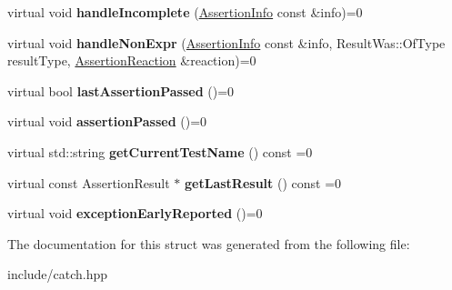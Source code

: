 \begin{DoxyCompactItemize}
\item 
virtual void {\bfseries handle\+Incomplete} (\hyperlink{structCatch_1_1AssertionInfo}{Assertion\+Info} const \&info)=0\hypertarget{structCatch_1_1IResultCapture_a89b89372eb09cc44f8dcad363de6157d}{}\label{structCatch_1_1IResultCapture_a89b89372eb09cc44f8dcad363de6157d}

\item 
virtual void {\bfseries handle\+Non\+Expr} (\hyperlink{structCatch_1_1AssertionInfo}{Assertion\+Info} const \&info, Result\+Was\+::\+Of\+Type result\+Type, \hyperlink{structCatch_1_1AssertionReaction}{Assertion\+Reaction} \&reaction)=0\hypertarget{structCatch_1_1IResultCapture_ab7dbdf8aa28427119583e24dbb302c63}{}\label{structCatch_1_1IResultCapture_ab7dbdf8aa28427119583e24dbb302c63}

\item 
virtual bool {\bfseries last\+Assertion\+Passed} ()=0\hypertarget{structCatch_1_1IResultCapture_a973435fbdcb2f6f07a0ec5719a01e956}{}\label{structCatch_1_1IResultCapture_a973435fbdcb2f6f07a0ec5719a01e956}

\item 
virtual void {\bfseries assertion\+Passed} ()=0\hypertarget{structCatch_1_1IResultCapture_a9b0ef2cb071e9a9dc6ec1b533026aea7}{}\label{structCatch_1_1IResultCapture_a9b0ef2cb071e9a9dc6ec1b533026aea7}

\item 
virtual std\+::string {\bfseries get\+Current\+Test\+Name} () const =0\hypertarget{structCatch_1_1IResultCapture_aea1617f4a84cc648246aa3ed6918b5bf}{}\label{structCatch_1_1IResultCapture_aea1617f4a84cc648246aa3ed6918b5bf}

\item 
virtual const Assertion\+Result $\ast$ {\bfseries get\+Last\+Result} () const =0\hypertarget{structCatch_1_1IResultCapture_ab18872c89fab97405a56e9c6a4919736}{}\label{structCatch_1_1IResultCapture_ab18872c89fab97405a56e9c6a4919736}

\item 
virtual void {\bfseries exception\+Early\+Reported} ()=0\hypertarget{structCatch_1_1IResultCapture_ae63ecec95db4c236c63ecf616f483810}{}\label{structCatch_1_1IResultCapture_ae63ecec95db4c236c63ecf616f483810}

\end{DoxyCompactItemize}


The documentation for this struct was generated from the following file\+:\begin{DoxyCompactItemize}
\item 
include/catch.\+hpp\end{DoxyCompactItemize}
